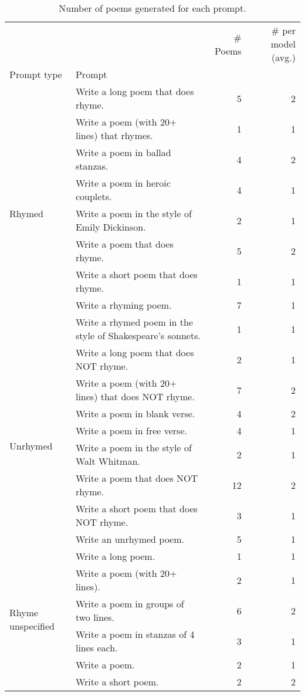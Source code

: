 \begin{table}[H]
  \centering
  \small
  \singlespacing
  \begin{tabular}{llrr}
  \toprule
   &  & \# Poems & \# per model (avg.) \\
  Prompt type & Prompt &  &  \\
  \midrule
  \multirow[t]{9}{*}{Rhymed} & Write a long poem that does rhyme. & 5 & 2 \\
   & Write a poem (with 20+ lines) that rhymes. & 1 & 1 \\
   & Write a poem in ballad stanzas. & 4 & 2 \\
   & Write a poem in heroic couplets. & 4 & 1 \\
   & Write a poem in the style of Emily Dickinson. & 2 & 1 \\
   & Write a poem that does rhyme. & 5 & 2 \\
   & Write a short poem that does rhyme. & 1 & 1 \\
   & Write a rhyming poem. & 7 & 1 \\
   & Write a rhymed poem in the style of Shakespeare's sonnets. & 1 & 1 \\
  \cline{1-4}
  \multirow[t]{8}{*}{Unrhymed} & Write a long poem that does NOT rhyme. & 2 & 1 \\
   & Write a poem (with 20+ lines) that does NOT rhyme. & 7 & 2 \\
   & Write a poem in blank verse. & 4 & 2 \\
   & Write a poem in free verse. & 4 & 1 \\
   & Write a poem in the style of Walt Whitman. & 2 & 1 \\
   & Write a poem that does NOT rhyme. & 12 & 2 \\
   & Write a short poem that does NOT rhyme. & 3 & 1 \\
   & Write an unrhymed poem. & 5 & 1 \\
  \cline{1-4}
  \multirow[t]{6}{*}{Rhyme unspecified} & Write a long poem. & 1 & 1 \\
   & Write a poem (with 20+ lines). & 2 & 1 \\
   & Write a poem in groups of two lines. & 6 & 2 \\
   & Write a poem in stanzas of 4 lines each. & 3 & 1 \\
   & Write a poem. & 2 & 1 \\
   & Write a short poem. & 2 & 2 \\
  \bottomrule
  \end{tabular}
  \caption{Number of poems generated for each prompt.}
  \label{tab:num_poems_rhyme_promptings}
\end{table}